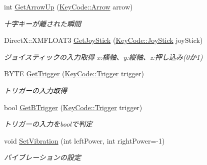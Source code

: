 \begin{DoxyCompactItemize}
int \hyperlink{class_game_pad_ae8a3c557c33dc7555f0aaf375ea9bc50}{Get\+Arrow\+Up} (\hyperlink{namespace_key_code_a16ba82423f2a8ac640d047568347eee4}{Key\+Code\+::\+Arrow} arrow)
\begin{DoxyCompactList}\small\item\em 十字キーが離された瞬間 \end{DoxyCompactList}\item 
Direct\+X\+::\+X\+M\+F\+L\+O\+A\+T3 \hyperlink{class_game_pad_a2eabf0bb7e2f9ef36716bccc19a51ebb}{Get\+Joy\+Stick} (\hyperlink{namespace_key_code_af3282177b831055ef900d2bf53e100db}{Key\+Code\+::\+Joy\+Stick} joy\+Stick)
\begin{DoxyCompactList}\small\item\em ジョイスティックの入力取得  x\+:横軸、y\+:縦軸、z\+:押し込み(0か1) \end{DoxyCompactList}\item 
B\+Y\+TE \hyperlink{class_game_pad_aced63f31a45307163f26d7e8b592655b}{Get\+Trigger} (\hyperlink{namespace_key_code_a68dc8420d4850fe68378bc682c360e30}{Key\+Code\+::\+Trigger} trigger)
\begin{DoxyCompactList}\small\item\em トリガーの入力取得 \end{DoxyCompactList}\item 
bool \hyperlink{class_game_pad_af725ed0df42fe67e599928b3580dd66b}{Get\+B\+Trigger} (\hyperlink{namespace_key_code_a68dc8420d4850fe68378bc682c360e30}{Key\+Code\+::\+Trigger} trigger)
\begin{DoxyCompactList}\small\item\em トリガーの入力をboolで判定 \end{DoxyCompactList}\item 
void \hyperlink{class_game_pad_a2e65a8d4d2a8e23fa1846f4b6c54fca7}{Set\+Vibration} (int left\+Power, int right\+Power=-\/1)
\begin{DoxyCompactList}\small\item\em バイブレーションの設定 \end{DoxyCompactList}\end{DoxyCompactItemize}
